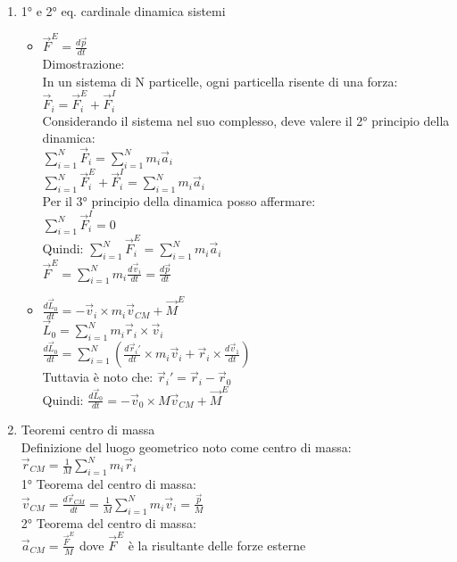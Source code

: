 \documentclass[8pt]{scrreprt}
\begin{document}
\begin{multicols*}{2}
\begin{enumerate}
\item 1° e 2° eq. cardinale dinamica sistemi\\
\begin{itemize}
\item $\vec{F}^E = \frac{d\vec{p}}{dt}$\\
Dimostrazione:\\
In un sistema di N particelle, ogni particella risente di una forza:
$\vec{F}_i = \vec{F}_i^E + \vec{F}_i^I$\\
Considerando il sistema nel suo complesso, deve valere il 2° principio della dinamica:\\
$\sum_{i=1}^N \vec{F}_i = \sum_{i=1}^N m_i \vec{a}_i$\\
$\sum_{i=1}^N \vec{F}_i^E +\vec{F}_i^I = \sum_{i=1}^N m_i \vec{a}_i$\\
Per il 3° principio della dinamica posso affermare:\\
$\sum_{i=1}^N \vec{F}_i^I = 0$\\
Quindi:
$\sum_{i=1}^N \vec{F}_i^E = \sum_{i=1}^N m_i \vec{a}_i$\\
$\vec{F}^E = \sum_{i=1}^N m_i \frac{d\vec{v}_i}{dt} = \frac{d\vec{p}}{dt}$

\item $\frac{d\vec{L}_0}{dt} = -\vec{v}_i \times m_i \vec{v}_{CM} + \vec{M}^E$\\
$\vec{L}_0 = \sum_{i=1}^N m_i \vec{r}_i \times \vec{v}_i$\\
$\frac{d\vec{L}_0}{dt} = \sum_{i=1}^N (\frac{d\vec{r}_i'}{dt} \times m_i \vec{v}_i + \vec{r}_i \times \frac{d\vec{v}_1}{dt})$\\
Tuttavia è noto che: $\vec{r}_i' = \vec{r}_i - \vec{r}_0$\\
Quindi: $\frac{d\vec{L}_0}{dt} = - \vec{v}_0 \times M \vec{v}_{CM} +\vec{M}^E$
\end{itemize}

\item Teoremi centro di massa\\
Definizione del luogo geometrico noto come centro di massa:\\
$\vec{r}_{CM} = \frac{1}{M} \sum_{i=1}^N m_i \vec{r}_i$\\
1° Teorema del centro di massa:\\
$\vec{v}_{CM} = \frac{d\vec{r}_{CM}}{dt} = \frac{1}{M} \sum_{i=1}^N m_i \vec{v}_i = \frac{\vec{p}}{M}$\\
2° Teorema del centro di massa:\\
$\vec{a}_{CM} = \frac{\vec{F}^E}{M}$ \quad dove $\vec{F}^E$ è la risultante delle forze esterne\\



\end{enumerate}
\end{multicols*}
\end{document}
